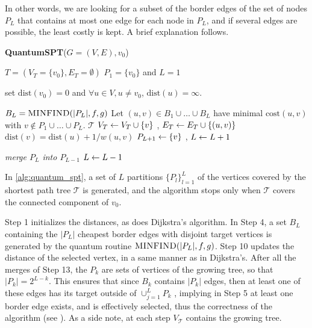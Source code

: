 In other words, we are looking for a subset of the border edges of the set of nodes $P_L$ that contains at most one edge for
each node in $P_L$, and if several edges are possible, the least costly is kept. A brief explanation follows.

\begin{algorithm}[H]
\caption{\textbf{QuantumSPT}($G=(V,E),v_0$)}\label{alg:quantum_spt}
\begin{algorithmic}[1]
    \Require $T =( V_T=\{v_0\}, E_T =\emptyset) $ 
    \Require $P_1 = \{v_0\}$ and $L=1$

    \State  set $\text{dist}(v_0) = 0$ and $\forall u\in V, u \neq v_0$, $\text{dist}(u) = \infty$.

    \State {}
    \State $B_L = \textsc{MINFIND}(|P_L|,f,g)$
    \State Let $(u,v) \in B_1 \cup \dots \cup B_L$ have minimal $\text{cost}(u,v)$ with $v\notin P_1 \cup \dots \cup P_L$. 
    \State \Return $\mathcal{T}$
    \Else
    \State $V_T \leftarrow V_T \cup \{v\}$ , $E_T \leftarrow E_T \cup \{(u,v)\}$
    \State $\text{dist}(v) = \text{dist}(u) + 1/w(u,v)$
    \State $P_{L+1} \leftarrow \{v\}$ , $L\leftarrow L+1$
    \EndIf

    \State \textit{merge $P_L$ into $P_{L-1}$}
    \State $L \leftarrow L-1$

    \EndWhile
    \EndWhile
\end{algorithmic}
\end{algorithm}

In \autoref{alg:quantum_spt}, a set of $L$ partitions $\{P_l\}_{l=1}^L$ of the vertices covered by the shortest path tree $\mathcal T$ is generated, and the algorithm stops only when $\mathcal T$ covers the connected component of $v_0$.

Step 1 initializes the distances, as does Dijkstra's algorithm. In Step 4, a set
$B_L$ containing the $|P_L|$ cheapest border edges with disjoint target vertices
is generated by the quantum routine $\textsc{MINFIND}(|P_L|,f,g)$. Step 10
updates the distance of the selected vertex, in a same manner as in Dijkstra's.
After all the merges of Step 13, the $P_k$ are sets of vertices of the growing
tree, so that $|P_k| = 2^{L-k}$. This ensures that since $B_k$ contains $|P_k|$
edges, then at least one of these edges has its target outside of $\cup_{j=1}^L
P_k$ , implying in Step 5 at least one border edge exists, and is
effectively selected, thus the correctness of the algorithm (see \cite[Appendix
A, Proposition 5]{apers_quantum_2019}).
As a side note, at each step $V_{\mathcal{T}}$ contains the growing tree.

